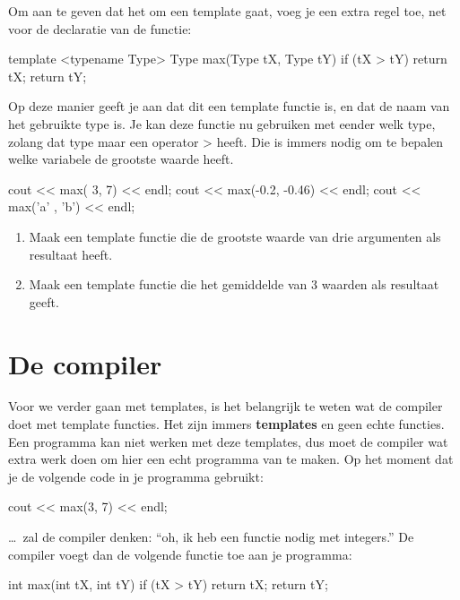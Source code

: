 \documentclass[11pt, oldfontcommands, oneside, a4paper]{memoir}
\begin{document}
Om aan te geven dat het om een template gaat, voeg je een extra regel toe, net voor de declaratie van de functie:

\begin{code}
template <typename Type>
Type max(Type tX, Type tY) {
  if (tX > tY) return tX;
  return tY;
}
\end{code}

Op deze manier geeft je aan dat dit een template functie is, en dat  de naam van het gebruikte type is. Je kan deze functie nu gebruiken met eender welk type, zolang dat type maar een operator > heeft. Die is immers nodig om te bepalen welke variabele de grootste waarde heeft.

\begin{code}
cout << max(   3,     7) << endl;
cout << max(-0.2, -0.46) << endl;
cout << max('a' ,   'b') << endl;
\end{code}

\begin{exercise}
\begin{enumerate}
	\item Maak een template functie  die de grootste waarde van drie argumenten als resultaat heeft.
	\item Maak een template functie  die het gemiddelde van 3 waarden als resultaat geeft.
\end{enumerate}
\end{exercise}

\section{De compiler}

Voor we verder gaan met templates, is het belangrijk te weten wat de compiler doet met template functies. Het zijn immers \textbf{templates} en geen echte functies. Een programma kan niet werken met deze templates, dus moet de compiler wat extra werk doen om hier een echt programma van te maken. Op het moment dat je de volgende code in je programma gebruikt:

\begin{code}
cout << max(3, 7) << endl;
\end{code}

\ldots\ zal de compiler denken: ``oh, ik heb een functie  nodig met integers.'' De compiler voegt dan de volgende functie toe aan je programma:

\begin{code}
int max(int tX, int tY) {
  if (tX > tY) return tX;
  return tY;
}
\end{code}
\end{document}
